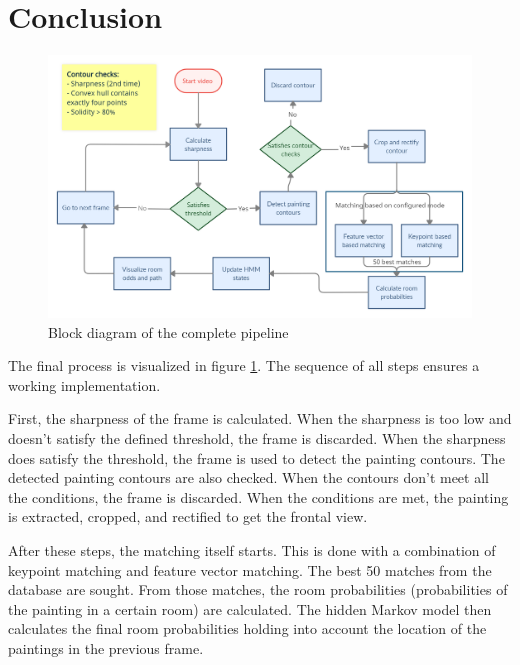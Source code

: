 \section*{Conclusion}

\begin{figure}
	\centering
	\begin{minipage}{1.5\columnwidth}
		\centering
		\includegraphics[width=\textwidth]{images/boxchart.png}
		\caption{Block diagram of the complete pipeline}
		\label{fig:blockdiagram}
	\end{minipage}%
\end{figure}




The final process is visualized in figure \ref{fig:blockdiagram}. The sequence of all steps ensures a working implementation.

First, the sharpness of the frame is calculated. When the sharpness is too low and doesn't satisfy the defined threshold, the frame is discarded. When the sharpness does satisfy the threshold, the frame is used to detect the painting contours. The detected painting contours are also checked. When the contours don't meet all the conditions, the frame is discarded. When the conditions are met, the painting is extracted, cropped, and rectified to get the frontal view.

After these steps, the matching itself starts. This is done with a combination of keypoint matching and feature vector matching. The best 50 matches from the database are sought. From those matches, the room probabilities (probabilities of the painting in a certain room) are calculated. The hidden Markov model then calculates the final room probabilities holding into account the location of the paintings in the previous frame. 

